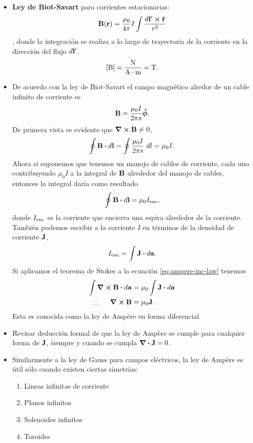 \begin{itemize}
\item \textbf{Ley de Biot-Savart} para corrientes estacionarias:
\begin{align}
\vb{B}(\vb{r})=\frac{\mu_0}{4\pi}I\int \frac{d\vb{l}'\cp\vb{\hat{r}}}
{r^2}
\end{align},
donde la integración se realiza a lo largo de trayectoria de la corriente
en la dirección del flujo $d\vb{l}'$.
\begin{align}
\qty[\text{B}]=\frac{\text{N}}{\text{A}\cdot \text{m}}=\text{T}.
\end{align}

\item De acuerdo con la ley de Biot-Savart el campo magnético 
alredor de un cable infinito de corriente es 
\begin{align}
\vb{B}=\frac{\mu_0I}{2\pi s} \boldsymbol{\hat{\mathrm{\phi}}}.
\end{align}
De primera vista es evidente que $\curl{\vb{B}}\neq 0$,
\begin{align}
\oint \vb{B}\vdot d\vb{l}
= \oint\frac{\mu_0I}{2\pi s}\ dl =\mu_0 I.
\end{align}
Ahora si suponemos que tenemos un manojo de cables de 
corriente, cada uno contribuyendo $\mu_0I$ a la integral de 
$\vb{B}$ alrededor del manojo de cables, entonces la integral 
daría como resultado 
\begin{align*}
\oint \vb{B}\vdot d\vb{l}=\mu_0I_{\tx{enc}},
\label{eq:ampere-inc-law}
\end{align*}
donde $I_{\text{enc}}$ es la corriente que encierra una espira 
alrededor de la corriente. También podemos escribir a la corriente
$I$ en términos de la densidad de corriente $\vb{J}$,
\begin{align}
I_{\tx{enc}}=\int \vb{J}\vdot d\vb{a}.
\end{align}
Si aplicamos el teorema de Stokes a la ecuación \eqref{eq:ampere-inc-law}
tenemos
\begin{align}
\int\curl{\vb{B}}\vdot d\vb{a}&=\mu_0\int \vb{J}\vdot d\vb{a}\\
\therefore \hspace{5mm} \curl{\vb{B}}&=\mu_0\vb{J}.
\end{align}
Esta es conocida como la ley de Ampère en forma diferencial.

\item \h{Revisar deducción formal de que la ley de Ampère se cumple 
para cualquier forma de $\vb{J}$,	} \newline
\h{siempre y cuando se cumpla $\div{\vb{J}}=0$.}

\item Similarmente a la ley de Gauss para campos eléctricos, la 
ley de Ampère es útil sólo cuando existen ciertas simetrías:
\begin{enumerate}
\item Líneas infinitas de corriente
\item Planos infinitos
\item Solenoides infinitos
\item Toroides
\end{enumerate}
\end{itemize}

